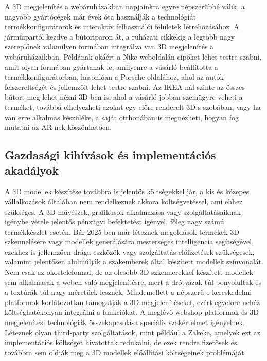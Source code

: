 \documentclass[12pt]{report}
\begin{document}
        A 3D megjelenítés a webáruházakban napjainkra egyre népszerűbbé válik, a nagyobb gyártócégek már évek óta használják a technológiát termékkonfigurátorok és interaktív felhasználói felületek létrehozásához. A járműipartól kezdve a bútoriparon át, a ruházati cikkekig a legtöbb nagy szereplőnek valamilyen formában integrálva van 3D megjelenítés a webáruházaikban. Példának okáért a Nike weboldalán cipőket lehet testre szabni, amit olyan formában gyártanak le, amilyenre a vásárló beállította a termékkonfigurátorban, hasonlóan a Porsche oldalához, ahol az autók felszereltségét és jellemzőit lehet testre szabni. Az IKEA-nál szinte az összes bútort meg lehet nézni 3D-ben is, ahol a vásárló jobban szemügyre veheti a terméket, továbbá elhelyezheti azokat egy előre renderelt 3D-s szobában, vagy ha van erre alkalmas készüléke, a saját otthonában is megnézheti, hogyan fog mutatni az AR-nek köszönhetően. 
        
        \subsection{Gazdasági kihívások és implementációs akadályok}

        A 3D modellek készítése továbbra is jelentős költségekkel jár, a kis és közepes vállalkozások általában nem rendelkeznek akkora költségvetéssel, ami ehhez szükséges. A 3D művészek, grafikusok alkalmazása vagy szolgáltatásaiknak igénybe vétele jelentős pénzügyi befektetést igényel, főleg nagy számú termékkészlet esetén. 
        Bár 2025-ben már léteznek megoldások termékek 3D szkennelésére vagy modellek generálására mesterséges intelligencia segítségével, ezekhez is jellemzően drága eszközök vagy szolgáltatás-előfizetések szükségesek, valamint jelentősen alulmúlják a szakemberek által készített modellek színvonalát. Nem csak az okostelefonnal, de az olcsóbb 3D szkennerekkel készített modellek sem alkalmasak a weben való megjelenítésre, mert a drótvázak túl bonyolultak és a textúrák túl nagy méretűek lesznek. Mindemellett a népszerű e-kereskedelmi platformok korlátozottan támogatják a 3D megjelenítéseket, ezért egyelőre nehéz költséghatékonyan integrálni a funkciókat. A meglévő webshop-platformok és 3D megjelenítési technológiák összekapcsolása speciális szakértelmet igényelnek. Léteznek olyan third-party szolgáltatások, mint például a Zakeke, amelyek ezt az implementációs költséget hivatottak redukálni, de ezek rendre fizetősek és továbbra sem oldják meg a 3D modellek előállítási költségeinek problémáját.
            
\end{document}
